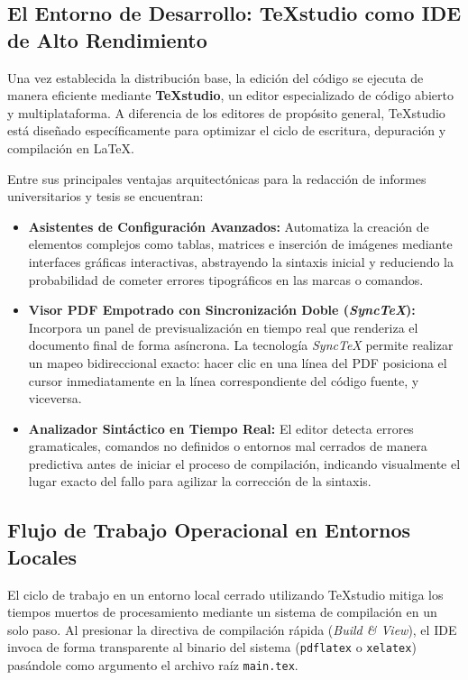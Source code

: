 \subsection{El Entorno de Desarrollo: TeXstudio como IDE de Alto Rendimiento}
Una vez establecida la distribución base, la edición del código se ejecuta de manera eficiente mediante \textbf{TeXstudio}, un editor especializado de código abierto y multiplataforma. A diferencia de los editores de propósito general, TeXstudio está diseñado específicamente para optimizar el ciclo de escritura, depuración y compilación en \LaTeX.

Entre sus principales ventajas arquitectónicas para la redacción de informes universitarios y tesis se encuentran:
\begin{itemize}
    \item \textbf{Asistentes de Configuración Avanzados:} Automatiza la creación de elementos complejos como tablas, matrices e inserción de imágenes mediante interfaces gráficas interactivas, abstrayendo la sintaxis inicial y reduciendo la probabilidad de cometer errores tipográficos en las marcas o comandos.
    \item \textbf{Visor PDF Empotrado con Sincronización Doble (\textit{SyncTeX}):} Incorpora un panel de previsualización en tiempo real que renderiza el documento final de forma asíncrona. La tecnología \textit{SyncTeX} permite realizar un mapeo bidireccional exacto: hacer clic en una línea del PDF posiciona el cursor inmediatamente en la línea correspondiente del código fuente, y viceversa.
    \item \textbf{Analizador Sintáctico en Tiempo Real:} El editor detecta errores gramaticales, comandos no definidos o entornos mal cerrados de manera predictiva antes de iniciar el proceso de compilación, indicando visualmente el lugar exacto del fallo para agilizar la corrección de la sintaxis.
\end{itemize}

\subsection{Flujo de Trabajo Operacional en Entornos Locales}
El ciclo de trabajo en un entorno local cerrado utilizando TeXstudio mitiga los tiempos muertos de procesamiento mediante un sistema de compilación en un solo paso. Al presionar la directiva de compilación rápida (\textit{Build \& View}), el IDE invoca de forma transparente al binario del sistema (\texttt{pdflatex} o \texttt{xelatex}) pasándole como argumento el archivo raíz \texttt{main.tex}.

